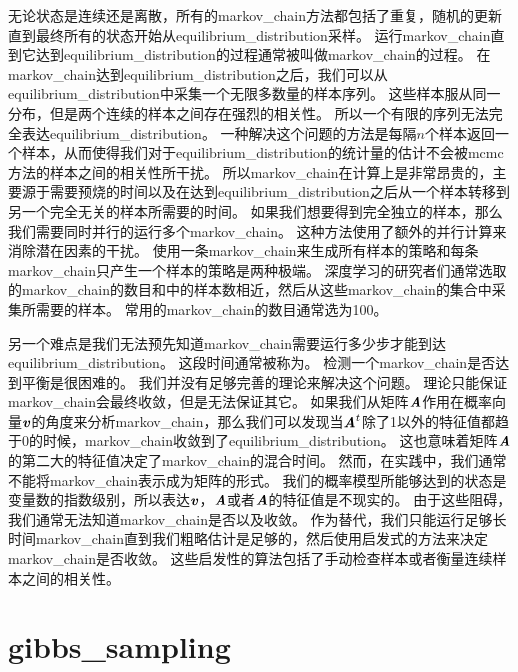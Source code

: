 无论状态是连续还是离散，所有的\gls{markov_chain}方法都包括了重复，随机的更新直到最终所有的状态开始从\gls{equilibrium_distribution}采样。
运行\gls{markov_chain}直到它达到\gls{equilibrium_distribution}的过程通常被叫做\gls{markov_chain}的过程。
在\gls{markov_chain}达到\gls{equilibrium_distribution}之后，我们可以从\gls{equilibrium_distribution}中采集一个无限多数量的样本序列。
这些样本服从同一分布，但是两个连续的样本之间存在强烈的相关性。
所以一个有限的序列无法完全表达\gls{equilibrium_distribution}。
一种解决这个问题的方法是每隔$n$个样本返回一个样本，从而使得我们对于\gls{equilibrium_distribution}的统计量的估计不会被\gls{mcmc}方法的样本之间的相关性所干扰。
所以\gls{markov_chain}在计算上是非常昂贵的，主要源于需要预烧的时间以及在达到\gls{equilibrium_distribution}之后从一个样本转移到另一个完全无关的样本所需要的时间。
如果我们想要得到完全独立的样本，那么我们需要同时并行的运行多个\gls{markov_chain}。
这种方法使用了额外的并行计算来消除潜在因素的干扰。
使用一条\gls{markov_chain}来生成所有样本的策略和每条\gls{markov_chain}只产生一个样本的策略是两种极端。
深度学习的研究者们通常选取的\gls{markov_chain}的数目和中的样本数相近，然后从这些\gls{markov_chain}的集合中采集所需要的样本。
常用的\gls{markov_chain}的数目通常选为100。

另一个难点是我们无法预先知道\gls{markov_chain}需要运行多少步才能到达\gls{equilibrium_distribution}。 
这段时间通常被称为。
检测一个\gls{markov_chain}是否达到平衡是很困难的。
我们并没有足够完善的理论来解决这个问题。
理论只能保证\gls{markov_chain}会最终收敛，但是无法保证其它。
如果我们从矩阵$\boldsymbol{\mathit{A}}$作用在概率向量$\boldsymbol{\mathit{v}}$的角度来分析\gls{markov_chain}，那么我们可以发现当$\boldsymbol{\mathit{A}}^t$除了1以外的特征值都趋于0的时候，\gls{markov_chain}收敛到了\gls{equilibrium_distribution}。
这也意味着矩阵$\boldsymbol{\mathit{A}}$的第二大的特征值决定了\gls{markov_chain}的混合时间。
然而，在实践中，我们通常不能将\gls{markov_chain}表示成为矩阵的形式。
我们的概率模型所能够达到的状态是变量数的指数级别，所以表达$\boldsymbol{\mathit{v}}$，$\boldsymbol{\mathit{A}}$或者$\boldsymbol{\mathit{A}}$的特征值是不现实的。
由于这些阻碍，我们通常无法知道\gls{markov_chain}是否以及收敛。
作为替代，我们只能运行足够长时间\gls{markov_chain}直到我们粗略估计是足够的，然后使用启发式的方法来决定\gls{markov_chain}是否收敛。
这些启发性的算法包括了手动检查样本或者衡量连续样本之间的相关性。



\section{\gls{gibbs_sampling}}
\label{sec:gibbs_sampling}

